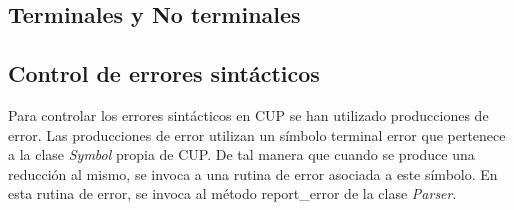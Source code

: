 \subsection{Terminales y No terminales}
\subsection{Control de errores sintácticos}

Para controlar los errores sintácticos en CUP se han utilizado producciones de error. Las producciones de error utilizan un símbolo terminal error que pertenece a la clase \textit{Symbol} propia de CUP.\newline\newline
De tal manera que cuando se produce una reducción al mismo, se invoca a una rutina de error asociada a este símbolo. En esta rutina de error, se invoca al método report\_error de la clase \textit{Parser}.
\clearpage

